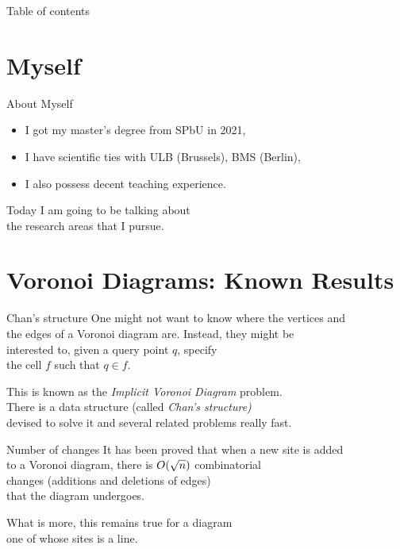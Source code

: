 \documentclass[12pt,aspectratio=169,svgnames]{beamer}
\begin{document}
 \maketitle

\begin{frame}{Table of contents}
	\tableofcontents
\end{frame}

\section{Myself}

\begin{frame}{About Myself}
\begin{itemize}
	\item I got my master's degree from SPbU in 2021,
	\item I have scientific ties with ULB (Brussels), BMS (Berlin),
	\item I also possess decent teaching experience.
\end{itemize} \vspace{4mm}

	Today I am going to be talking about \\ the research areas that I pursue.

\end{frame}

\section{Voronoi Diagrams: Known Results}

\begin{frame}{Chan's structure}
	One might not want to know where the vertices and \\
	the edges of a Voronoi diagram are. Instead, they might be \\
	interested to, given a query point \(q\), specify \\
	the cell \(f\) such that \(q \in f\). \bigskip

	This is known as the {\it Implicit Voronoi Diagram} problem. \\
	There is a data structure (called {\it Chan's structure)} \\
	devised to solve it and several related problems really fast.
\end{frame}

\begin{frame}{Number of changes}
	It has been proved that when a new site is added \\
	to a Voronoi diagram, there is \(O\lr*{\sqrt{n}}\) combinatorial \\
	changes (additions and deletions of edges) \\
	that the diagram undergoes. \bigskip

	What is more, this remains true for a diagram \\
	one of whose sites is a line.
\end{frame}
\end{document}

